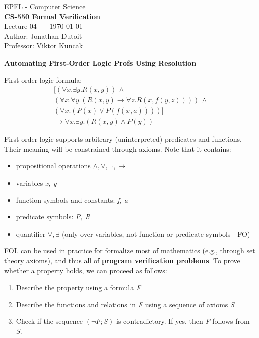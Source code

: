 \documentclass[11pt]{article}
\newcommand{\coursename}{CS-550 Formal Verification}
\newcommand{\lecturenum}{04}
\newcommand{\lecturedate}{\today}
\newcommand{\professor}{Viktor Kuncak}
\begin{document}
\begin{center}
  {\large EPFL - Computer Science} \\[0.5em]
  {\Large \textbf{\coursename}} \\[0.5em]
  {\large Lecture \lecturenum\ --- \lecturedate} \\[0.5em]
  {\large Author: Jonathan Dutoit} \\[0.5em]
  {\large Professor: \professor} \\[0.5em]
\end{center}

\vspace{1.0cm}
\begin{center}
  {\LARGE \textbf{Automating First-Order Logic Profs Using Resolution}}
\end{center}
\vspace{1cm}
First-order logic formula:
\[
	\begin{align*}
		[(\forall x. \exists y. R(x, y)) \, \land \\ 
		(\forall x. \forall y. (R(x, y) \to \forall z. R(x, f(y, z)))) \, \land \\
		(\forall x. (P(x) \lor P(f(x, a))))] \\
		\to \forall x .\exists y. (R(x, y) \land P(y)) 
	\end{align*}
\] 	

First-order logic supports arbitrary (uninterpreted) predicates and functions. Their meaning will be constrained through axioms. Note that it contains: 
\begin{itemize}
	\item propositional operations $\land, \lor, \neg, \to$
	\item variables \textit{x, y}
	\item function symbols and constants: \textit{f, a}
	\item predicate symbols: \textit{P, R}
	\item quantifier $\forall, \exists$ (only over variables, not function or predicate symbols - FO) 
\end{itemize}

FOL can be used in practice for formalize most of mathematics (e.g., through set theory axioms), and thus all of \underline{\textbf{program verification problems}}. To prove whether a property holds, we can proceed as follows: 
\begin{enumerate}
	\item Describe the property using a formula \textit{F}
	\item Describe the functions and relations in \textit{F} using a sequence of axioms \textit{S}
	\item Check if the sequence $(\neg F; S)$ is contradictory. If yes, then \textit{F} follows from \textit{S}. 
\end{enumerate}
\end{document}
